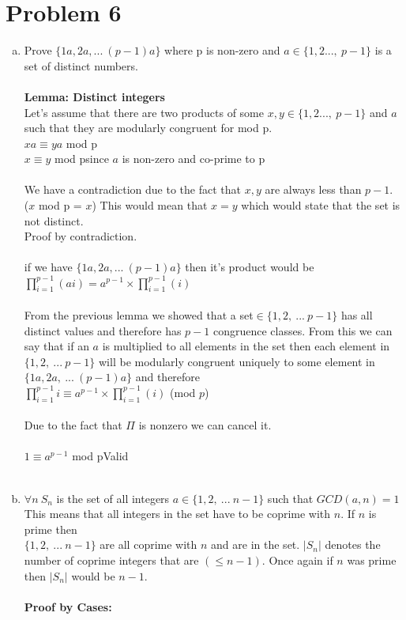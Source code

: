 \documentclass[11pt,letterpaper]{article}
\begin{document}
\section*{Problem 6}
\begin{enumerate}[(a)]
\item
Prove $\{1a,2a, ... ~(p-1)a\}$ where p is non-zero and $a\in\{1, 2 ...,~p-1\}$ is a set of distinct numbers.\\\\

\textbf{Lemma: Distinct integers}\\
Let's assume that there are two products of some $x,y\in\{1, 2 ...,~p-1\}$ and $a$ such that they are modularly congruent for mod p.\\
$xa\equiv ya$ mod p\\
$x\equiv y$ mod p\hfill since $a$ is non-zero and co-prime to p\\\\
We have a contradiction due to the fact that $x,y$ are always less than $p-1.$\\
($x$ mod p = $x$) This would mean that $x=y$ which would state that the set is not distinct.\\Proof by contradiction.\\\\
if we have $\{1a,2a, ... ~(p-1)a\}$ then it's product would be $\prod\limits_{i=1}^{p-1}(ai)=a^{p-1}\times\prod\limits_{i=1}^{p-1}(i)$\\\\
From the previous lemma we showed that a set$\in\{1,2,~...~p-1\}$ has all distinct values and therefore has $p-1$ congruence classes. From this we can say that if an $a$ is multiplied to all elements in the set then each element in $\{1,2,~...~p-1\}$ will be modularly congruent uniquely to some element in $\{1a,2a,~...~(p-1)a\}$ and therefore\\
$\prod\limits_{i=1}^{p-1}i\equiv a^{p-1}\times\prod\limits_{i=1}^{p-1}(i)$ (mod $p$)\\\\
Due to the fact that $\Pi$ is nonzero we can cancel it.\\\\
$1\equiv a^{p-1}$ mod p\hfill Valid\\\\
\clearpage

\item
$\forall n~S_n$ is the set of all integers $a\in \{1,2,~...~n-1\}$ such that $GCD(a,n) =1$\\
This means that all integers in the set have to be coprime with $n$. If $n$ is prime then\\ $\{1,2,~...~n-1\}$ are all coprime with $n$ and are in the set. $|S_n|$ denotes the number of coprime integers that are $(\leq n-1).$ Once again if $n$ was prime then $|S_n|$ would be $n-1.$\\
\\
\textbf{Proof by Cases:}\\


\end{enumerate}
\end{document}
